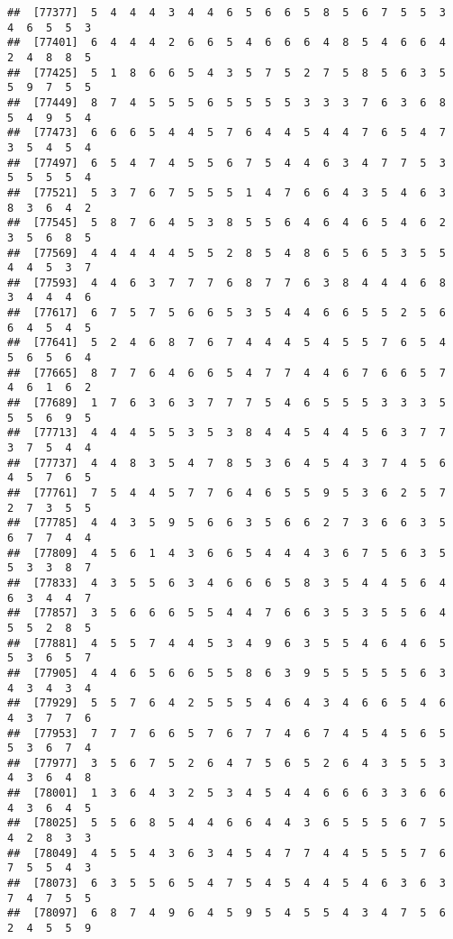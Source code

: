 \documentclass[
]{book}
\begin{document}
\begin{verbatim}
##  [77377]  5  4  4  4  3  4  4  6  5  6  6  5  8  5  6  7  5  5  3  4  6  5  5  3
##  [77401]  6  4  4  4  2  6  6  5  4  6  6  6  4  8  5  4  6  6  4  2  4  8  8  5
##  [77425]  5  1  8  6  6  5  4  3  5  7  5  2  7  5  8  5  6  3  5  5  9  7  5  5
##  [77449]  8  7  4  5  5  5  6  5  5  5  5  3  3  3  7  6  3  6  8  5  4  9  5  4
##  [77473]  6  6  6  5  4  4  5  7  6  4  4  5  4  4  7  6  5  4  7  3  5  4  5  4
##  [77497]  6  5  4  7  4  5  5  6  7  5  4  4  6  3  4  7  7  5  3  5  5  5  5  4
##  [77521]  5  3  7  6  7  5  5  5  1  4  7  6  6  4  3  5  4  6  3  8  3  6  4  2
##  [77545]  5  8  7  6  4  5  3  8  5  5  6  4  6  4  6  5  4  6  2  3  5  6  8  5
##  [77569]  4  4  4  4  4  5  5  2  8  5  4  8  6  5  6  5  3  5  5  4  4  5  3  7
##  [77593]  4  4  6  3  7  7  7  6  8  7  7  6  3  8  4  4  4  6  8  3  4  4  4  6
##  [77617]  6  7  5  7  5  6  6  5  3  5  4  4  6  6  5  5  2  5  6  6  4  5  4  5
##  [77641]  5  2  4  6  8  7  6  7  4  4  4  5  4  5  5  7  6  5  4  5  6  5  6  4
##  [77665]  8  7  7  6  4  6  6  5  4  7  7  4  4  6  7  6  6  5  7  4  6  1  6  2
##  [77689]  1  7  6  3  6  3  7  7  7  5  4  6  5  5  5  3  3  3  5  5  5  6  9  5
##  [77713]  4  4  4  5  5  3  5  3  8  4  4  5  4  4  5  6  3  7  7  3  7  5  4  4
##  [77737]  4  4  8  3  5  4  7  8  5  3  6  4  5  4  3  7  4  5  6  4  5  7  6  5
##  [77761]  7  5  4  4  5  7  7  6  4  6  5  5  9  5  3  6  2  5  7  2  7  3  5  5
##  [77785]  4  4  3  5  9  5  6  6  3  5  6  6  2  7  3  6  6  3  5  6  7  7  4  4
##  [77809]  4  5  6  1  4  3  6  6  5  4  4  4  3  6  7  5  6  3  5  5  3  3  8  7
##  [77833]  4  3  5  5  6  3  4  6  6  6  5  8  3  5  4  4  5  6  4  6  3  4  4  7
##  [77857]  3  5  6  6  6  5  5  4  4  7  6  6  3  5  3  5  5  6  4  5  5  2  8  5
##  [77881]  4  5  5  7  4  4  5  3  4  9  6  3  5  5  4  6  4  6  5  5  3  6  5  7
##  [77905]  4  4  6  5  6  6  5  5  8  6  3  9  5  5  5  5  5  6  3  4  3  4  3  4
##  [77929]  5  5  7  6  4  2  5  5  5  4  6  4  3  4  6  6  5  4  6  4  3  7  7  6
##  [77953]  7  7  7  6  6  5  7  6  7  7  4  6  7  4  5  4  5  6  5  5  3  6  7  4
##  [77977]  3  5  6  7  5  2  6  4  7  5  6  5  2  6  4  3  5  5  3  4  3  6  4  8
##  [78001]  1  3  6  4  3  2  5  3  4  5  4  4  6  6  6  3  3  6  6  4  3  6  4  5
##  [78025]  5  5  6  8  5  4  4  6  6  4  4  3  6  5  5  5  6  7  5  4  2  8  3  3
##  [78049]  4  5  5  4  3  6  3  4  5  4  7  7  4  4  5  5  5  7  6  7  5  5  4  3
##  [78073]  6  3  5  5  6  5  4  7  5  4  5  4  4  5  4  6  3  6  3  7  4  7  5  5
##  [78097]  6  8  7  4  9  6  4  5  9  5  4  5  5  4  3  4  7  5  6  2  4  5  5  9

\end{verbatim}
\end{document}
